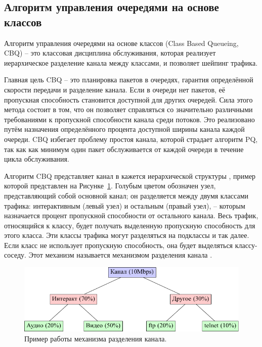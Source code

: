     \subsection{Алгоритм управления очередями на основе классов}

        Алгоритм управления очередями на основе классов (Class Based Queueing, CBQ) -- это
        классовая дисциплина обслуживания, которая реализует
        иерархическое разделение канала между классами, и позволяет
        шейпинг трафика. \cite{tccbq}

        Главная цель CBQ -- это планировка пакетов в очередях, гарантия определённой
        скорости передачи и разделение канала. Если в очереди нет пакетов, её
        пропускная способность становится доступной для других очередей. Сила
        этого метода состоит в том, что он позволяет справляться со значительно
        различными требованиями к пропускной способности канала среди потоков. Это
        реализовано путём назначения определённого процента доступной ширины
        канала каждой очереди. CBQ избегает проблему простоя канала, которой страдает
        алгоритм PQ, так как как минимум один пакет обслуживается от каждой очереди
        в течение цикла обслуживания.\cite{packethandling}

		Алгоритм CBQ представляет канал в кажется иерархической структуры \cite{linksharing},
		пример которой представлен на Рисунке~\ref{pic:cbq}. Голубым цветом обозначен узел,
		представляющий собой основной канал; он разделяется между двумя классами трафика:
		интерактивным (левый узел) и остальным (правый узел), -- которым назначается процент
		пропускной способности от остального канала. Весь трафик, относящийся к классу,
		будет получать выделенную пропускную способность для этого класса. Эти
		классы трафика могут разделяться на подклассы и так далее. Если класс не использует
		пропускную способность, она будет выделяться классу-соседу. Этот механизм
		называется механизмом разделения канала \cite{linksharing}. 

        \begin{figure}[ht!]
			\center
            \includegraphics[scale=1.3]{./pdfimages/cbq.pdf}
            \caption{Пример работы механизма разделения канала.}
			\label{pic:cbq}
        \end{figure}

